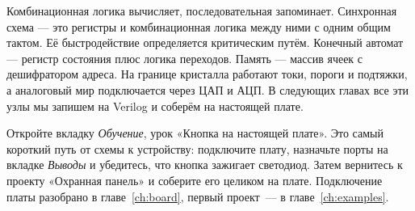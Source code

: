 \begin{ideabox}
Комбинационная логика вычисляет, последовательная запоминает. Синхронная
схема --- это регистры и комбинационная логика между ними с одним общим тактом.
Её быстродействие определяется критическим путём. Конечный автомат ---
регистр состояния плюс логика переходов. Память --- массив ячеек с дешифратором
адреса. На границе кристалла работают токи, пороги и подтяжки, а аналоговый
мир подключается через ЦАП и АЦП. В следующих главах все эти узлы мы
запишем на Verilog и соберём на настоящей плате.
\end{ideabox}

\begin{buildbox}
Откройте вкладку \emph{Обучение}, урок «Кнопка на настоящей плате». Это самый
короткий путь от схемы к устройству: подключите плату, назначьте порты на
вкладке \emph{Выводы} и убедитесь, что кнопка зажигает светодиод. Затем
вернитесь к проекту «Охранная панель» и соберите его целиком на плате.
Подключение платы разобрано в главе~\ref{ch:board}, первый проект~---
в главе~\ref{ch:examples}.
\end{buildbox}
